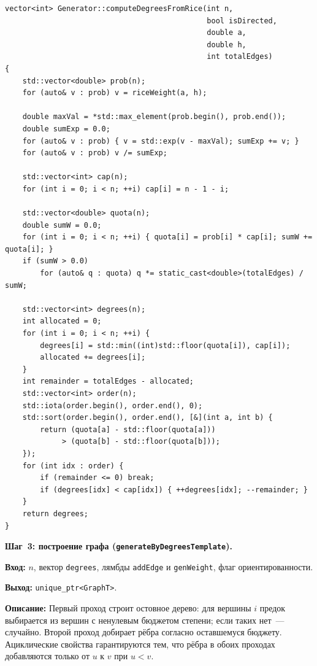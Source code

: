 \begin{lstlisting}[style=cppstyle, caption={Вычисление целевых степеней (Generator.cc)}]
vector<int> Generator::computeDegreesFromRice(int n,
                                              bool isDirected,
                                              double a,
                                              double h,
                                              int totalEdges)
{
    std::vector<double> prob(n);
    for (auto& v : prob) v = riceWeight(a, h);

    double maxVal = *std::max_element(prob.begin(), prob.end());
    double sumExp = 0.0;
    for (auto& v : prob) { v = std::exp(v - maxVal); sumExp += v; }
    for (auto& v : prob) v /= sumExp;

    std::vector<int> cap(n);
    for (int i = 0; i < n; ++i) cap[i] = n - 1 - i;

    std::vector<double> quota(n);
    double sumW = 0.0;
    for (int i = 0; i < n; ++i) { quota[i] = prob[i] * cap[i]; sumW += quota[i]; }
    if (sumW > 0.0)
        for (auto& q : quota) q *= static_cast<double>(totalEdges) / sumW;

    std::vector<int> degrees(n);
    int allocated = 0;
    for (int i = 0; i < n; ++i) {
        degrees[i] = std::min((int)std::floor(quota[i]), cap[i]);
        allocated += degrees[i];
    }
    int remainder = totalEdges - allocated;
    std::vector<int> order(n);
    std::iota(order.begin(), order.end(), 0);
    std::sort(order.begin(), order.end(), [&](int a, int b) {
        return (quota[a] - std::floor(quota[a]))
             > (quota[b] - std::floor(quota[b]));
    });
    for (int idx : order) {
        if (remainder <= 0) break;
        if (degrees[idx] < cap[idx]) { ++degrees[idx]; --remainder; }
    }
    return degrees;
}
\end{lstlisting}

\textbf{Шаг~3: построение графа (\texttt{generateByDegreesTemplate}).}

\textbf{Вход:} $n$, вектор \texttt{degrees}, лямбды \texttt{addEdge}
и \texttt{genWeight}, флаг ориентированности.

\textbf{Выход:} \texttt{unique\_ptr<GraphT>}.

\textbf{Описание:} Первый проход строит остовное дерево: для вершины $i$
предок выбирается из вершин с ненулевым бюджетом степени; если таких нет~---
случайно. Второй проход добирает рёбра согласно оставшемуся бюджету.
Ациклические свойства гарантируются тем, что рёбра в обоих проходах
добавляются только от $u$ к $v$ при $u < v$.

